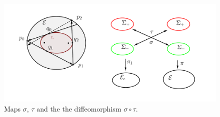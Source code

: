 \begin{figure}
	\begin{center}
		 \includegraphics[scale=0.45]{chap_05/pics/pics-05-050-orbitas-dinamica.pdf}
		\caption{Maps $\sigma$, $\tau$ and the the diffeomorphism $\sigma\circ\tau$.}
	\end{center}
\label{fig:caustic2}
\end{figure}
